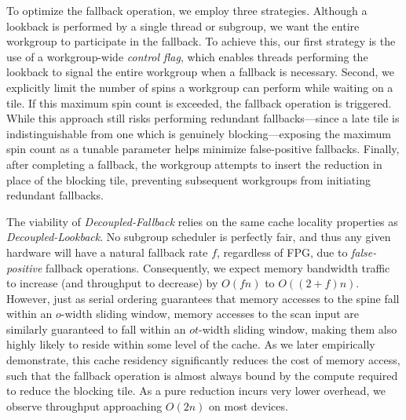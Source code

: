 \documentclass[sigconf]{acmart}
\begin{document}
To optimize the fallback operation, we employ three strategies. Although a lookback is performed by a single thread or subgroup, we want the entire workgroup to participate in the fallback. To achieve this, our first strategy is the use of a workgroup-wide \emph{control flag}, which enables threads performing the lookback to signal the entire workgroup when a fallback is necessary. Second, we explicitly limit the number of spins a workgroup can perform while waiting on a tile. If this maximum spin count is exceeded, the fallback operation is triggered. While this approach still risks performing redundant fallbacks---since a late tile is indistinguishable from one which is genuinely blocking---exposing the maximum spin count as a tunable parameter helps minimize false-positive fallbacks. Finally, after completing a fallback, the workgroup attempts to insert the reduction in place of the blocking tile, preventing subsequent workgroups from initiating redundant fallbacks.

The viability of \emph{Decoupled-Fallback} relies on the same cache locality properties as \emph{Decoupled-Lookback}. No subgroup scheduler is perfectly fair, and thus any given hardware will have a natural fallback rate $f$, regardless of FPG, due to \emph{false-positive} fallback operations. Consequently, we expect memory bandwidth traffic to increase (and throughput to decrease) by $O(fn)$ to $O((2 + f)n)$. However, just as serial ordering guarantees that memory accesses to the spine fall within an $o$-width sliding window, memory accesses to the scan input are similarly guaranteed to fall within an $ot$-width sliding window, making them also highly likely to reside within some level of the cache. As we later empirically demonstrate, this cache residency significantly reduces the cost of memory access, such that the fallback operation is almost always bound by the compute required to reduce the blocking tile. As a pure reduction incurs very lower overhead, we observe throughput approaching $O(2n)$ on most devices.
\end{document}
